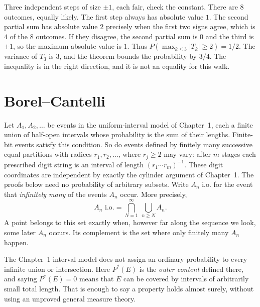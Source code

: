 Three independent steps of size $\pm1$, each fair, check the constant. There are $8$ outcomes, equally likely. The first step always has absolute value $1$. The second partial sum has absolute value $2$ precisely when the first two signs agree, which is $4$ of the $8$ outcomes. If they disagree, the second partial sum is $0$ and the third is $\pm1$, so the maximum absolute value is $1$. Thus $P(\max_{k\le3}|T_k|\ge2)=1/2$. The variance of $T_3$ is $3$, and the theorem bounds the probability by $3/4$. The inequality is in the right direction, and it is not an equality for this walk.

\section{Borel--Cantelli}

Let $A_1,A_2,\ldots$ be events in the uniform-interval model of Chapter~1, each a finite union of half-open intervals whose probability is the sum of their lengths. Finite-bit events satisfy this condition. So do events defined by finitely many successive equal partitions with radices $r_1,r_2,\ldots$, where $r_j\ge2$ may vary: after $m$ stages each prescribed digit string is an interval of length $(r_1\cdots r_m)^{-1}$. These digit coordinates are independent by exactly the cylinder argument of Chapter~1. The proofs below need no probability of arbitrary subsets. Write $A_n\text{ i.o.}$ for the event that \emph{infinitely many} of the events $A_n$ occur. More precisely,
\[
 A_n\text{ i.o.}=\bigcap_{N=1}^{\infty}\ \bigcup_{n\ge N} A_n.
\]
A point belongs to this set exactly when, however far along the sequence we look, some later $A_n$ occurs. Its complement is the set where only finitely many $A_n$ happen.

The Chapter~1 interval model does not assign an ordinary probability to every infinite union or intersection. Here $P^*(E)$ is the \emph{outer content} defined there, and saying $P^*(E)=0$ means that $E$ can be covered by intervals of arbitrarily small total length. That is enough to say a property holds almost surely, without using an unproved general measure theory.

